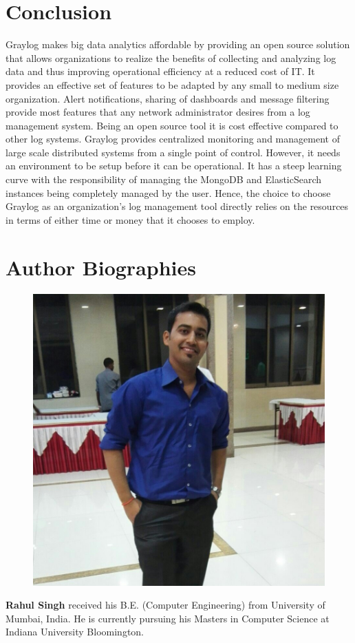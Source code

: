 \documentclass[9pt,twocolumn,twoside]{../../styles/osajnl}
\begin{document}
\section{Conclusion}
Graylog makes big data analytics affordable by providing an open
source solution that allows organizations to realize the benefits of
collecting and analyzing log data and thus improving operational
efficiency at a reduced cost of IT. It provides an effective set of
features to be adapted by any small to medium size organization. Alert
notifications, sharing of dashboards and message filtering provide
most features that any network administrator desires from a log
management system. Being an open source tool it is cost effective
compared to other log systems. Graylog provides centralized monitoring
and management of large scale distributed systems from a single point
of control. However, it needs an environment to be setup before it can
be operational. It has a steep learning curve with the responsibility
of managing the MongoDB and ElasticSearch instances being completely
managed by the user. Hence, the choice to choose Graylog as an
organization's log management tool directly relies on the resources in
terms of either time or money that it chooses to employ.





 
\section*{Author Biographies}
\begingroup
\setlength\intextsep{0pt}
\begin{minipage}[t][3.2cm][t]{1.0\columnwidth} %
  \begin{figure}
    \includegraphics[width=0.25\columnwidth]{images/rahul_singh.jpg}
  \end{figure}
  \noindent
{\bfseries Rahul Singh} received his B.E. (Computer Engineering) from
University of Mumbai, India. He is currently pursuing his Masters in
Computer Science at Indiana University Bloomington.

\end{minipage}
\endgroup
\end{document}
